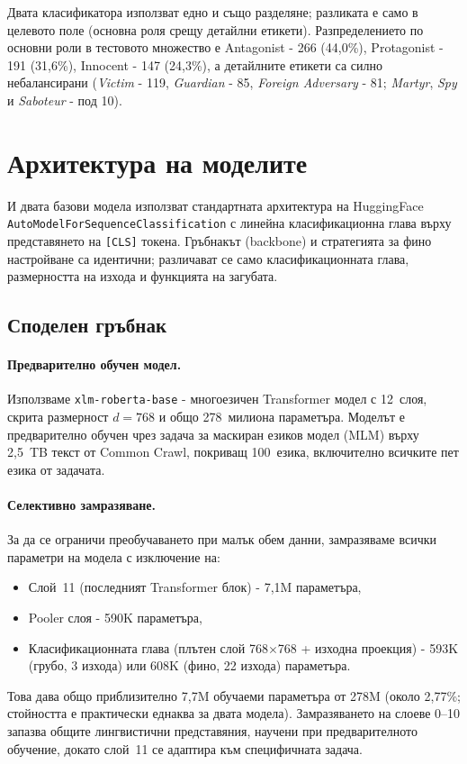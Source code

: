 \documentclass[12pt,a4paper]{report}
\begin{document}
Двата класификатора използват едно и също разделяне; разликата е само в целевото поле (основна роля срещу детайлни етикети). Разпределението по основни роли в тестовото множество е Antagonist - 266 (44,0\%), Protagonist - 191 (31,6\%), Innocent - 147 (24,3\%), а детайлните етикети са силно небалансирани (\textit{Victim} - 119, \textit{Guardian} - 85, \textit{Foreign Adversary} - 81; \textit{Martyr}, \textit{Spy} и \textit{Saboteur} - под 10).


\section{Архитектура на моделите}

И двата базови модела използват стандартната архитектура на HuggingFace \texttt{AutoModelForSequenceClassification} с линейна класификационна глава върху представянето на \texttt{[CLS]} токена. Гръбнакът (backbone) и стратегията за фино настройване са идентични; различават се само класификационната глава, размерността на изхода и функцията на загубата.

\subsection{Споделен гръбнак}

\paragraph{Предварително обучен модел.} Използваме \texttt{xlm-roberta-base} \cite{conneau2020xlmr} - многоезичен Transformer модел с 12~слоя, скрита размерност $d=768$ и общо 278~милиона параметъра. Моделът е предварително обучен чрез задача за маскиран езиков модел (MLM) върху 2,5~TB текст от Common Crawl, покриващ 100~езика, включително всичките пет езика от задачата.

\paragraph{Селективно замразяване.} За да се ограничи преобучаването при малък обем данни, замразяваме всички параметри на модела с изключение на:
\begin{itemize}
  \item Слой~11 (последният Transformer блок) - 7,1M параметъра,
  \item Pooler слоя - 590K параметъра,
  \item Класификационната глава (плътен слой 768$\times$768 + изходна проекция) - 593K (грубо, 3 изхода) или 608K (фино, 22 изхода) параметъра.
\end{itemize}
Това дава общо приблизително 7,7M обучаеми параметъра от 278M (около 2,77\%; стойността е практически еднаква за двата модела). Замразяването на слоеве 0--10 запазва общите лингвистични представяния, научени при предварителното обучение, докато слой~11 се адаптира към специфичната задача.
\end{document}
